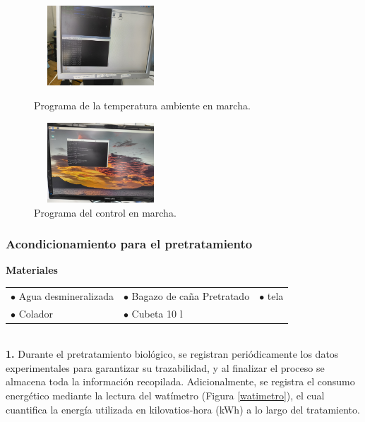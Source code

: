 \documentclass[12pt]{article}
\begin{document}
			\begin{figure}[H]
				\centering
				\begin{minipage}{0.46\textwidth}
					\centering
					\includegraphics[width=5cm, height=3cm]{imagenes/programa1} %
					\caption{Programa de la temperatura ambiente en marcha.}
					\label{progra 1}
				\end{minipage}
				\hfill
				\begin{minipage}{0.48\textwidth}
					\centering
					\includegraphics[width=5cm, height=3cm]{imagenes/programa2} %
					\caption{Programa del control en marcha.}
					\label{progra 2}
				\end{minipage}
			\end{figure}
			

			
			
			
			
			
			\subsubsection{Acondicionamiento para el pretratamiento}
			
			 \textbf{Materiales}
			
		
			\begin{tabular}{p{0.3\textwidth}p{}p{}}
				$\bullet$ Agua desmineralizada & $\bullet$  Bagazo de caña Pretratado & $\bullet$ tela  \\
			
				$\bullet$ Colador & $\bullet$ Cubeta 10 l & 
			\end{tabular}
			\\
			
			
			\textbf{1.} Durante el pretratamiento biológico, se registran periódicamente los datos experimentales para garantizar su trazabilidad, y al finalizar el proceso se almacena toda la información recopilada. Adicionalmente, se registra el consumo energético mediante la lectura del watímetro (Figura \ref{watimetro}), el cual cuantifica la energía utilizada en kilovatios-hora (kWh) a lo largo del tratamiento.
			
\end{document}
